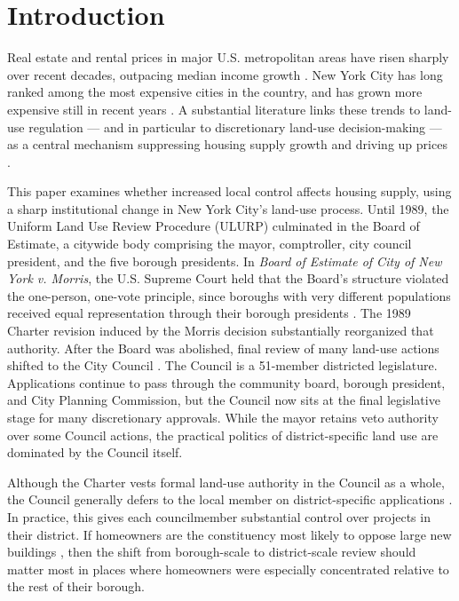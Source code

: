 \section{Introduction}
\label{sec:intro}

Real estate and rental prices in major U.S. metropolitan areas have risen sharply over recent decades, outpacing median income growth \cite{joint_center_for_housing_studies_of_harvard_university_americas_2024}.
New York City has long ranked among the most expensive cities in the country, and has grown more expensive still in recent years \cite{glaeser_why_2005-1}.
A substantial literature links these trends to land-use regulation --- and in particular to discretionary land-use decision-making --- as a central mechanism suppressing housing supply growth and driving up prices \cite{fischel_homevoter_2009,hilber_origins_2013, paciorek_supply_2013, khan_decentralized_2021,kulka_how_2022}.

This paper examines whether increased local control affects housing supply, using a sharp institutional change in New York City's land-use process.
Until 1989, the Uniform Land Use Review Procedure (ULURP) culminated in the Board of Estimate, a citywide body comprising the mayor, comptroller, city council president, and the five borough presidents.
In \textit{Board of Estimate of City of New York v. Morris}, the U.S. Supreme Court held that the Board's structure violated the one-person, one-vote principle, since boroughs with very different populations received equal representation through their borough presidents \cite{board_of_estimate_of_city_of_new_york_v_morris_notitle_1989}.
The 1989 Charter revision induced by the Morris decision substantially reorganized that authority.
After the Board was abolished, final review of many land-use actions shifted to the City Council \citep{lane_policy_1998}.
The Council is a 51-member districted legislature.
Applications continue to pass through the community board, borough president, and City Planning Commission, but the Council now sits at the final legislative stage for many discretionary approvals. While the mayor retains veto authority over some Council actions, the practical politics of district-specific land use are dominated by the Council itself.

Although the Charter vests formal land-use authority in the Council as a whole, the Council generally defers to the local member on district-specific applications \cite{donaldson_charter_2025}.
In practice, this gives each councilmember substantial control over projects in their district.
If homeowners are the constituency most likely to oppose large new buildings \cite{fischel_homevoter_2009}, then the shift from borough-scale to district-scale review should matter most in places where homeowners were especially concentrated relative to the rest of their borough.

